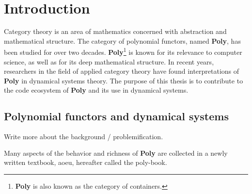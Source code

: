 \chapter{Introduction}
Category theory is an area of mathematics concerned with abstraction and mathematical structure. The category of polynomial functors, named \textbf{Poly}, has been studied for over two decades. \textbf{Poly}\footnote{\textbf{Poly} is also known as the category of containers.} is known for its relevance to computer science, as well as for its deep mathematical structure. In recent years, researchers in the field of applied category theory have found interpretations of \textbf{Poly} in dynamical systems theory. The purpose of this thesis is to contribute to the code ecosystem of \textbf{Poly} and its use in dynamical systems.









\section{Polynomial functors and dynamical systems}
Write more about the background / problemification.

Many aspects of the behavior and richness of \textbf{Poly} are collected in a newly written textbook, aoeu, hereafter called the poly-book. 

